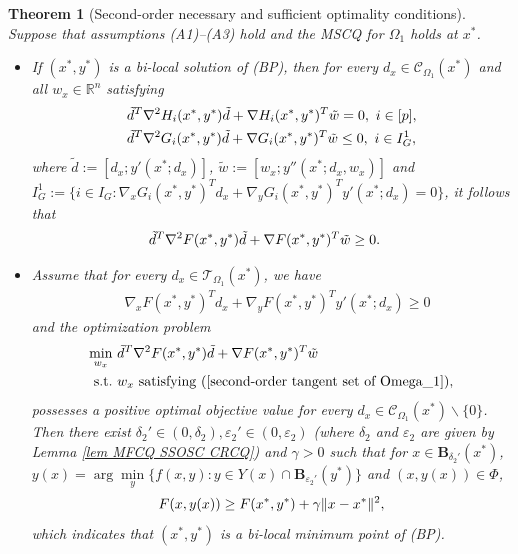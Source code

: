 \documentclass[11pt]{article}
\newtheorem{theorem}{Theorem}[section]
\theoremstyle{definition}
\theoremstyle{remark}
\numberwithin{equation}{section}
\begin{document}
\begin{theorem}[Second-order necessary and sufficient optimality conditions]\label{thm SOSC for SP}
Suppose that assumptions \textnormal{(A1)}--\textnormal{(A3)} hold and the MSCQ for $\Omega_1$ holds at $x^*$.
\begin{itemize}
  \item[(i)]If $(x^*,y^*)$ is a bi-local solution of (BP), then for every $d_x\in \mathcal{C}_{\Omega_1}(x^*)$ and all $w_x\in
      \mathbb{R}^n$ satisfying
      \begin{align}\label{second-order tangent set of Omega_1}
 &   \tilde{d}^T\nabla^2 H_i(x^*, y^*)\tilde{d} +\nabla H_i(x^*, y^*)^{T}\tilde{w}=0,~ i\in[p], \\
 &    \tilde{d}^T\nabla^2 G_i(x^*, y^*)\tilde{d}  +\nabla G_i(x^*, y^*)^{T}\tilde{w}\le0,~ i\in I_G^1,\notag
\end{align}
where $\tilde{d}:=[d_x; y'(x^*;d_x)]$, $\tilde{w}:=[w_x;y''(x^*;d_x,w_x)]$  and $I_G^1:=\{i\in I_G:\nabla_x G_i(x^*, y^*)^{T} d_x+\nabla_y G_i(x^*, y^*)^{T} y'(x^*;d_x)=0\}$,
       it follows that
   \begin{align}\label{align F''}
        &\tilde{d}^T\nabla^2 F(x^*, y^*)\tilde{d}+\nabla F(x^*, y^*)^{T}\tilde{w}\ge0.\notag
      \end{align}
  \item[(ii)] Assume that for every $d_x\in\mathcal{T}_{\Omega_1}(x^*)$, we
        have
 \begin{align*}
   & \nabla_x F(x^*, y^*)^{T} d_x+\nabla_y F(x^*, y^*)^{T} y'(x^*;d_x)\ge 0
 \end{align*} and  the optimization problem
   \begin{align}%
    \min_{w_x}~&\tilde{d}^T\nabla^2 F(x^*, y^*)\tilde{d}+\nabla F(x^*, y^*)^{T}\tilde{w}\notag \\
     {\rm s.t.}~&w_x ~{\rm satisfying}~ (\ref{second-order tangent set of Omega_1})\notag,
   \end{align}
possesses a positive optimal objective value for every $d_x\in \mathcal{C}_{\Omega_1}(x^*)\backslash \{0\}$.
Then there exist $\delta_2' \in(0, \delta_2), \varepsilon_2' \in(0, \varepsilon_2)$ (where $\delta_2$ and
  $\varepsilon_2$ are given by Lemma \ref{lem MFCQ SSOSC CRCQ})  and $\gamma>0$ such that for $x \in
  \boldsymbol{B}_{\delta_2'}(x^*)$, $y(x) =\arg\min\limits_y\{f(x,y):y\in Y(x)\cap \boldsymbol{B}_{\varepsilon_2'}(y^*) \} $
  and $(x,y(x))\in \Phi$,
\begin{equation}\label{equ-growth}
  F(x,y(x))\ge F(x^*,y^*)+\gamma \|x-x^*\|^2,\notag
\end{equation}
which indicates that $\left(x^*, y^*\right)$ is a bi-local minimum point of (BP).
\end{itemize}
\end{theorem}
\end{document}
